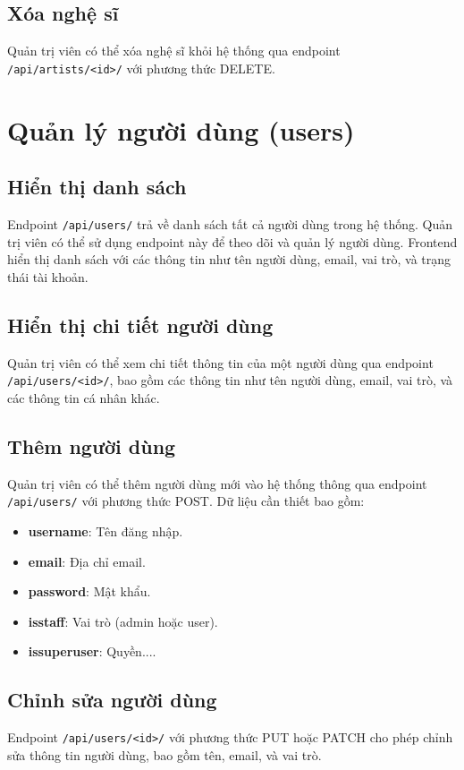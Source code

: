 \subsection{Xóa nghệ sĩ}
Quản trị viên có thể xóa nghệ sĩ khỏi hệ thống qua endpoint \texttt{/api/artists/<id>/} với phương thức DELETE.

\section{Quản lý người dùng (users)}
\subsection{Hiển thị danh sách}
Endpoint \texttt{/api/users/} trả về danh sách tất cả người dùng trong hệ thống. Quản trị viên có thể sử dụng endpoint này để theo dõi và quản lý người dùng. Frontend hiển thị danh sách với các thông tin như tên người dùng, email, vai trò, và trạng thái tài khoản.

\subsection{Hiển thị chi tiết người dùng}
Quản trị viên có thể xem chi tiết thông tin của một người dùng qua endpoint \texttt{/api/users/<id>/}, bao gồm các thông tin như tên người dùng, email, vai trò, và các thông tin cá nhân khác.

\subsection{Thêm người dùng}
Quản trị viên có thể thêm người dùng mới vào hệ thống thông qua endpoint \texttt{/api/users/} với phương thức POST. Dữ liệu cần thiết bao gồm:
\begin{itemize}
    \item \textbf{username}: Tên đăng nhập.
    \item \textbf{email}: Địa chỉ email.
    \item \textbf{password}: Mật khẩu.
    \item \textbf{isstaff}: Vai trò (admin hoặc user).
     \item \textbf{issuperuser}: Quyền....
\end{itemize}

\subsection{Chỉnh sửa người dùng}
Endpoint \texttt{/api/users/<id>/} với phương thức PUT hoặc PATCH cho phép chỉnh sửa thông tin người dùng, bao gồm tên, email, và vai trò.

